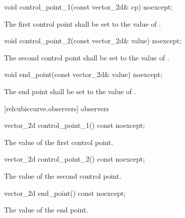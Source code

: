 \begin{itemdecl}
    void control_point_1(const vector_2d& cp) noexcept;
\end{itemdecl}
\begin{itemdescr}
	\pnum
	\effects
	The first control point shall be set to the value of .
\end{itemdescr}

\begin{itemdecl}
    void control_point_2(const vector_2d& value) noexcept;
\end{itemdecl}
\begin{itemdescr}
	\pnum
	\effects
	The second control point shall be set to the value of .
\end{itemdescr}

\begin{itemdecl}
    void end_point(const vector_2d& value) noexcept;
\end{itemdecl}
\begin{itemdescr}
	\pnum
	\effects
	The end point shall be set to the value of .
\end{itemdescr}

 [relcubiccurve.observers]{ observers}

\begin{itemdecl}
    vector_2d control_point_1() const noexcept;
\end{itemdecl}
\begin{itemdescr}
	\pnum
	\returns
	The value of the first control point.
\end{itemdescr}

\begin{itemdecl}
    vector_2d control_point_2() const noexcept;
\end{itemdecl}
\begin{itemdescr}
	\pnum
	\returns
	The value of the second control point.
\end{itemdescr}

\begin{itemdecl}
    vector_2d end_point() const noexcept;
\end{itemdecl}
\begin{itemdescr}
	\pnum
	\returns
	The value of the end point.
\end{itemdescr}
